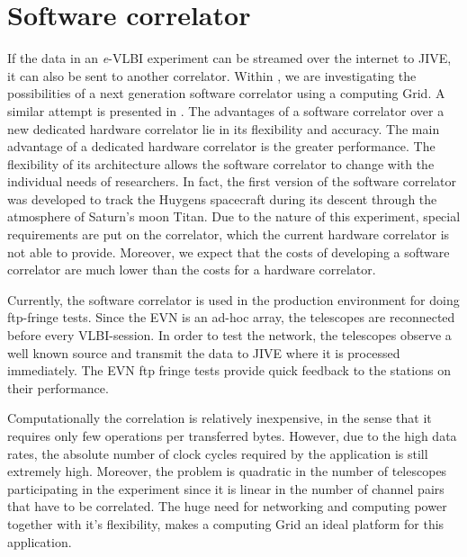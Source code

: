 \section{Software correlator}\label{sec:softwarecorrelation}
If the data in an {\it e}-VLBI experiment can be streamed over the
internet to JIVE, it can also be sent to another correlator. Within
\scarie, we are investigating the possibilities of a next generation
software correlator using a computing Grid. A similar attempt is
presented in \cite{deller-2007}. The advantages of a software
correlator over a new dedicated hardware correlator lie in its
flexibility and accuracy. The main advantage of a dedicated hardware
correlator is the greater performance. The flexibility of its
architecture allows the software correlator to change with the
individual needs of researchers. In fact, the first version of the
software correlator was developed to track the Huygens spacecraft
during its descent through the atmosphere of Saturn's moon Titan. Due
to the nature of this experiment, special requirements are put on the
correlator, which the current hardware correlator is not able to
provide.  Moreover, we expect that the costs of developing a software
correlator are much lower than the costs for a hardware correlator.

Currently, the software correlator is used in the production
environment for doing ftp-fringe tests. Since the EVN is an ad-hoc
array, the telescopes are reconnected before every VLBI-session. In
order to test the network, the telescopes observe a well known source
and transmit the data to JIVE where it is processed immediately. The
EVN ftp fringe tests provide quick feedback to the stations on their
performance.

Computationally the correlation is relatively inexpensive, in the
sense that it requires only few operations per transferred bytes.
However, due to the high data rates, the absolute number of clock
cycles required by the application is still extremely high.  Moreover,
the problem is quadratic in the number of telescopes participating in
the experiment since it is linear in the number of channel pairs that
have to be correlated. The huge need for networking and computing
power together with it's flexibility, makes a computing Grid an ideal
platform for this application.



